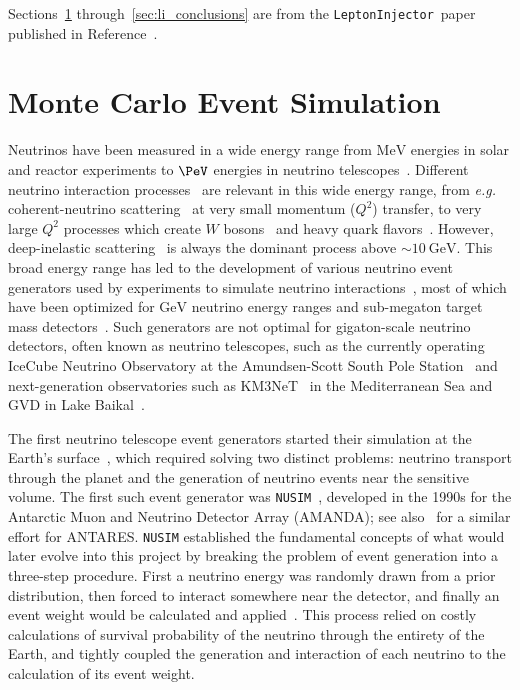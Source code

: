 \documentclass[main.tex]{subfiles}
\newcommand{\LeptonInjector}{\texttt{LeptonInjector}}
\newcommand{\nusim}{\texttt{NUSIM}}
\begin{document}
Sections~\ref{sec:mc_sim} through~\ref{sec:li_conclusions} are from the \LeptonInjector~paper published in Reference~\cite{ABBASI2021108018}.

\section{Monte Carlo Event Simulation}\label{sec:mc_sim}

Neutrinos have been measured in a wide energy range from $\si\MeV$ energies in solar and reactor experiments to $\si\PeV$ energies in neutrino telescopes~\cite{Vitagliano:2019yzm}.
Different neutrino interaction processes~\cite{Formaggio:2013kya} are relevant in this wide energy range, from \textit{e.g.} coherent-neutrino scattering~\cite{Akimov1123} at very small momentum ($Q^2$) transfer, to very large $Q^2$ processes which create $W$ bosons~\cite{Glashow:1960zz,Seckel:1997kk,Alikhanov:2014uja,Zhou:2019vxt,Beacom:2019pzs} and heavy quark flavors~\cite{Barge:2016uzn}.
However, deep-inelastic scattering~\cite{Gandhi:1995tf} is always the dominant process above $\sim\SI{10}\GeV$.
This broad energy range has led to the development of various neutrino event generators used by experiments to simulate neutrino interactions~\cite{Hayato:2002sd,Andreopoulos:2009rq,Golan:2012rfa,Lalakulich:2011eh}, most of which have been optimized for $\si\GeV$ neutrino energy ranges and sub-megaton target mass detectors~\cite{Andreopoulos:2009rq}.
Such generators are not optimal for gigaton-scale neutrino detectors, often known as neutrino telescopes, such as the currently operating IceCube Neutrino Observatory at the Amundsen-Scott South Pole Station~\cite{Aartsen:2016nxy} and next-generation observatories such as KM3NeT~\cite{Adrian-Martinez:2016fdl} in the Mediterranean Sea and GVD in Lake Baikal~\cite{Avrorin:2018ijk}.

The first neutrino telescope event generators started their simulation at the Earth's surface~\cite{osti_5884484,Hill:1996hzh,Gazizov:2004va,Yoshida:2003js}, which required solving two distinct problems: neutrino transport through the planet and the generation of neutrino events near the sensitive volume.
The first such event generator was \nusim{}~\cite{Hill:1996hzh}, developed in the 1990s for the Antarctic Muon and Neutrino Detector Array (AMANDA); see also~\cite{Bailey:2002} for a similar effort for ANTARES. 
\nusim{} established the fundamental concepts of what would later evolve into this project by breaking the problem of event generation into a three-step procedure. 
First a neutrino energy was randomly drawn from a prior distribution, then forced to interact somewhere near the detector, and finally an event weight would be calculated and applied~\cite{Hill:1996hzh}.
This process relied on costly calculations of survival probability of the neutrino through the entirety of the Earth, and tightly coupled the generation and interaction of each neutrino to the calculation of its event weight.
\end{document}
